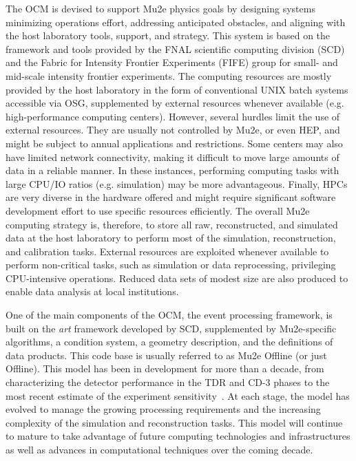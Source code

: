 
The OCM is devised to support Mu2e physics goals by designing systems minimizing operations effort, addressing anticipated obstacles, and aligning with the host laboratory tools, support, and strategy. This system is based on the framework and tools provided by the FNAL scientific computing division (SCD) and the Fabric for Intensity Frontier Experiments (FIFE) group for small- and mid-scale intensity frontier experiments. The computing resources are mostly provided by the host laboratory in the form of conventional UNIX batch systems accessible via OSG, supplemented by external resources whenever available (e.g. high-performance computing centers). However, several hurdles limit the use of external resources. They are usually not controlled by Mu2e, or even HEP, and might be subject to annual applications and restrictions. Some centers may also have limited network connectivity, making it difficult to move large amounts of data in a reliable manner. In these instances, performing computing tasks with large CPU/IO ratios (e.g. simulation) may be more advantageous. Finally, HPCs are very diverse in the hardware offered and might require significant software development effort to use specific resources efficiently. The overall Mu2e computing strategy is, therefore, to store all raw, reconstructed, and simulated data at the host laboratory to perform most of the simulation, reconstruction, and calibration tasks. External resources are exploited whenever available to perform non-critical tasks, such as simulation or data reprocessing, privileging CPU-intensive operations. Reduced data sets of modest size are also produced to enable data analysis at local institutions. 

One of the main components of the OCM, the event processing framework, is built on the {\it art} framework developed by SCD, supplemented by Mu2e-specific algorithms, a condition system, a geometry description, and the definitions of data products. This code base is usually referred to as Mu2e Offline (or just Offline). This model has been in development for more than a decade, from characterizing the detector performance in the TDR and CD-3 phases to the most recent estimate of the experiment sensitivity~\cite{Mu2e:2022ggl}. At each stage, the model has evolved to manage the growing processing requirements and the increasing complexity of the simulation and reconstruction tasks. This model will continue to mature to take advantage of future computing technologies and infrastructures as well as advances in computational techniques over the coming decade. 

